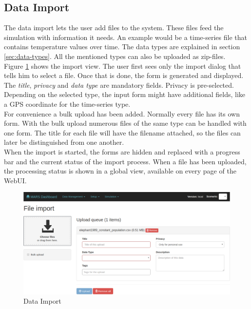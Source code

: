 \subsection{Data Import}
\label{sec:data-import}
The data import lets the user add files to the system. These files feed the simulation with information it needs. An example would be a time-series file that contains temperature values over time. The data types are explained in section \ref{sec:data-types}. All the mentioned types can also be uploaded as zip-files.\\
Figure \ref{fig:data-import-ui} shows the import view. The user first sees only the import dialog that tells him to select a file. Once that is done, the form is generated and displayed. The \textit{title}, \textit{privacy} and \textit{data type} are mandatory fields. Privacy is pre-selected. Depending on the selected type, the input form might have additional fields, like a GPS coordinate for the time-series type.\\
For convenience a bulk upload has been added. Normally every file has its own form. With the bulk upload numerous files of the same type can be handled with one form. The title for each file will have the filename attached, so the files can later be distinguished from one another.\\
When the import is started, the forms are hidden and replaced with a progress bar and the current status of the import process. When a file has been uploaded, the processing status is shown in a global view, available on every page of the WebUI.
\begin{figure}[H]
	\centering\includegraphics[width=1\textwidth]{res/workflow_data-import}
	\caption{Data Import}
	\label{fig:data-import-ui}
\end{figure}


